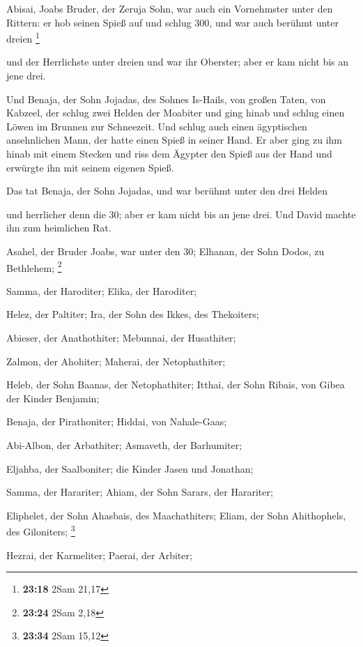  Abisai, Joabs Bruder, der Zeruja Sohn, war auch ein
Vornehmster unter den Rittern: er hob seinen Spieß auf und schlug 300,
und war auch berühmt unter dreien \footnote{\textbf{23:18} 2Sam 21,17}

 und der Herrlichste unter dreien und war ihr Oberster;
aber er kam nicht bis an jene drei.

 Und Benaja, der Sohn Jojadas, des Sohnes Is-Hails, von
großen Taten, von Kabzeel, der schlug zwei Helden der Moabiter und ging
hinab und schlug einen Löwen im Brunnen zur Schneezeit. 
Und schlug auch einen ägyptischen ansehnlichen Mann, der hatte einen
Spieß in seiner Hand. Er aber ging zu ihm hinab mit einem Stecken und
riss dem Ägypter den Spieß aus der Hand und erwürgte ihn mit seinem
eigenen Spieß.

 Das tat Benaja, der Sohn Jojadas, und war berühmt unter
den drei Helden

 und herrlicher denn die 30; aber er kam nicht bis an jene
drei. Und David machte ihn zum heimlichen Rat.

 Asahel, der Bruder Joabs, war unter den 30; Elhanan, der
Sohn Dodos, zu Bethlehem; \footnote{\textbf{23:24} 2Sam 2,18}

 Samma, der Haroditer; Elika, der Haroditer;

 Helez, der Paltiter; Ira, der Sohn des Ikkes, des
Thekoiters;

 Abieser, der Anathothiter; Mebunnai, der Husathiter;

 Zalmon, der Ahohiter; Maherai, der Netophathiter;

 Heleb, der Sohn Baanas, der Netophathiter; Itthai, der
Sohn Ribais, von Gibea der Kinder Benjamin;

 Benaja, der Pirathoniter; Hiddai, von Nahale-Gaas;

 Abi-Albon, der Arbathiter; Asmaveth, der Barhumiter;

 Eljahba, der Saalboniter; die Kinder Jasen und Jonathan;

 Samma, der Harariter; Ahiam, der Sohn Sarars, der
Harariter;

 Eliphelet, der Sohn Ahasbais, des Maachathiters; Eliam,
der Sohn Ahithophels, des Giloniters; \footnote{\textbf{23:34} 2Sam
  15,12}

 Hezrai, der Karmeliter; Paerai, der Arbiter;

